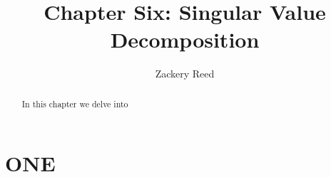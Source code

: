 \documentclass{xourse}
\title{Chapter Six: Singular Value Decomposition}
\author{Zackery Reed}
\begin{document}
\begin{abstract}
    In this chapter we delve into 
\end{abstract}
\maketitle

\part{ONE}
\sectionstyle

\chapterstyle

\end{document}
